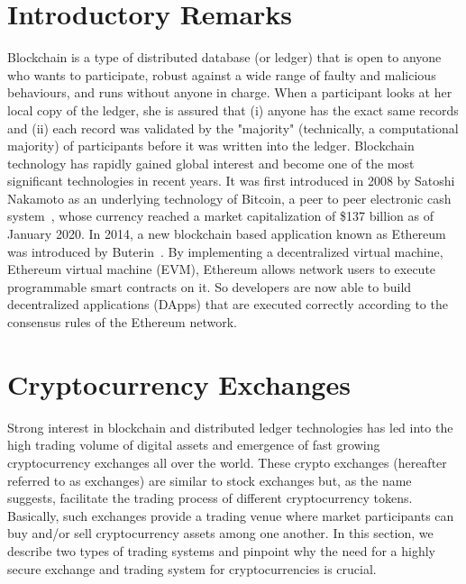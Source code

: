 




\section{Introductory Remarks}

Blockchain is a type of distributed database (or ledger) that is open to anyone who wants to participate, robust against a wide range of faulty and malicious behaviours, and runs without anyone in charge. When a participant looks at her local copy of the ledger, she is assured that (i) anyone has the exact same records and (ii) each record was validated by the "majority" (technically, a computational majority) of participants before it was written into the ledger. Blockchain technology has rapidly gained global interest and become one of the most significant technologies in recent years. It was first introduced in 2008 by Satoshi Nakamoto as an underlying technology of Bitcoin, a peer to peer electronic cash system~\cite{nakamoto2019bitcoin}, whose currency reached a market capitalization of \$137 billion as of January 2020. In 2014, a new blockchain based application known as Ethereum was introduced by Buterin~\cite{buterin2014next}. By implementing a decentralized virtual machine, Ethereum virtual machine (EVM), Ethereum allows network users to execute programmable smart contracts on it. So developers are now able to build decentralized applications (DApps) that are executed correctly according to the consensus rules of the Ethereum network. 

\section{Cryptocurrency Exchanges}
Strong interest in blockchain and distributed ledger technologies has led into the high trading volume of digital assets and emergence of fast growing cryptocurrency exchanges all over the world. These crypto exchanges (hereafter referred to as exchanges) are similar to stock exchanges but, as the name suggests, facilitate the trading process of different cryptocurrency tokens. Basically, such exchanges provide a trading venue where market participants can buy and/or sell cryptocurrency assets among one another. In this section, we describe two types of trading systems and pinpoint why the need for a highly secure exchange and trading system for cryptocurrencies is crucial.

